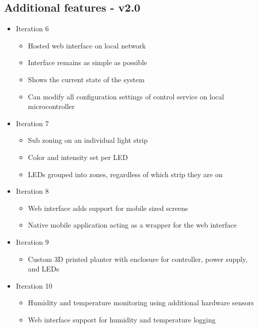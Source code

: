 		\subsection{Additional features - v2.0}
			\begin{itemize}
				\item Iteration 6
					\begin{itemize}
						\item Hosted web interface on local network
						\item Interface remains as simple as possible
						\item Shows the current state of the system
						\item Can modify all configuration settings of control service on local microcontroller
					\end{itemize}
				\item Iteration 7
					\begin{itemize}
						\item Sub zoning on an individual light strip
						\item Color and intensity set per LED
						\item LEDs grouped into zones, regardless of which strip they are on
					\end{itemize}
				\item Iteration 8
					\begin{itemize}
						\item Web interface adds support for mobile sized screens
						\item Native mobile application acting as a wrapper for the web interface
					\end{itemize}
				\item Iteration 9
					\begin{itemize}
						\item Custom 3D printed planter with enclosure for controller, power supply, and LEDs
					\end{itemize}
				\item Iteration 10
					\begin{itemize}
						\item Humidity and temperature monitoring using additional hardware sensors
						\item Web interface support for humidity and temperature logging
					\end{itemize}
			\end{itemize}


